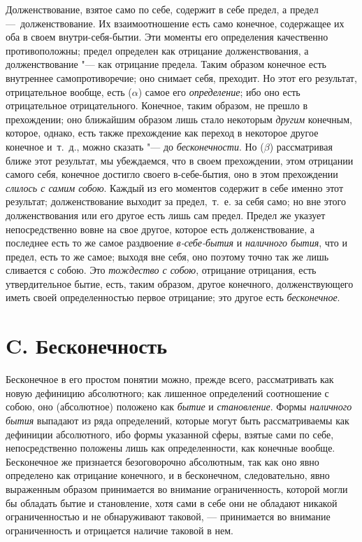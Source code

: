Долженствование, взятое само по себе, содержит в себе предел, а предел
—~долженствование. Их взаимоотношение есть само конечное, содержащее их оба
в своем внутри-себя-бытии. Эти моменты его определения качественно
противоположны; предел определен как отрицание долженствования, а
долженствование "--- как отрицание предела. Таким образом конечное есть
внутреннее самопротиворечие; оно снимает себя, преходит. Но этот его
результат, отрицательное вообще, есть ($\alpha $) самое его
{\em определение}; ибо оно есть отрицательное
отрицательного. Конечное, таким образом, не прешло в прехождении; оно
ближайшим образом лишь стало некоторым {\em другим}
конечным, которое, однако, есть также прехождение как переход в некоторое
другое конечное и~т.~д., можно сказать "--- до
{\em бесконечности}. Но ($\beta $) рассматривая ближе
этот результат, мы убеждаемся, что в своем прехождении, этом отрицании
самого себя, конечное достигло своего в-себе-бытия, оно в этом прехождении
{\em слилось с самим собою}. Каждый из его моментов
содержит в себе именно этот результат; долженствование выходит за
предел,~т.~е. за себя само; но вне этого долженствования или его другое
есть лишь сам предел. Предел же указует непосредственно вовне на свое
другое, которое есть долженствование, а последнее есть то же самое
раздвоение {\em в-себе-бытия} и
{\em наличного бытия}, что и предел, есть то же самое;
выходя вне себя, оно поэтому точно так же лишь сливается с собою. Это
{\em тождество с собою}, отрицание отрицания, есть
утвердительное бытие, есть, таким образом, другое конечного,
долженствующего иметь своей определенностью первое отрицание; это другое
есть {\em бесконечное}.

\section*{C. Бесконечность}
Бесконечное в его простом понятии можно, прежде всего, рассматривать как
новую дефиницию абсолютного; как лишенное определений соотношение с собою,
оно (абсолютное) положено как {\em бытие} и
{\em становление}. Формы
{\em наличного бытия} выпадают из ряда определений,
которые могут быть рассматриваемы как дефиниции абсолютного, ибо формы
указанной сферы, взятые сами по себе, непосредственно положены лишь как
определенности, как конечные вообще. Бесконечное же признается
безоговорочно абсолютным, так как оно явно определено как отрицание
конечного, и в бесконечном, следовательно, явно выраженным образом
принимается во внимание ограниченность, которой могли бы обладать бытие и
становление, хотя сами в себе они не обладают никакой ограниченностью и не
обнаруживают таковой, — принимается во внимание ограниченность и отрицается
наличие таковой в нем.

